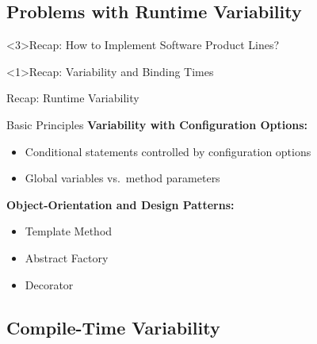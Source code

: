 \subsection{Problems with Runtime Variability}

\begin{frame}<3>{Recap: How to Implement Software Product Lines?}
	\frameImplementSPLs
\end{frame}

\begin{frame}<1>{Recap: Variability and Binding Times}
	\frameVariabilityAndBindingTimes
\end{frame}

\begin{frame}{Recap: Runtime Variability}
	\begin{mycolumns}[t]
		\begin{note}{Basic Principles}
			{\bf Variability with Configuration Options:}
			\begin{itemize}
				\item Conditional statements controlled by configuration options
				\item Global variables vs.\ method parameters
			\end{itemize}
			{\bf Object-Orientation and Design Patterns:}
			\begin{itemize}
				\item Template Method
				\item Abstract Factory
				\item Decorator
			\end{itemize}	
		\end{note}
	\mynextcolumn
		\frameRuntimeVariabilityProblems
	\end{mycolumns}	
\end{frame}

\subsection{Compile-Time Variability}

